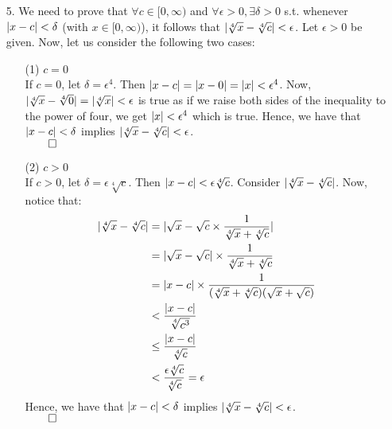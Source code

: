 \documentclass[11pt]{article}
\DeclarePairedDelimiter\abs{\lvert}{\rvert}%
\begin{document}
\begin{itemize}
    \newpage

    \item[5.]
        We need to prove that $\forall c \in [0, \infty)$ and
        $\forall \epsilon > 0, \exists \delta > 0$ s.t. whenever
        $\abs{x - c} < \delta$ (with $x \in [0, \infty)$), it follows that
        $\abs{\sqrt[4]{x} - \sqrt[4]{c}} < \epsilon$.
        Let $\epsilon > 0$ be given. Now, let us consider the following two
        cases:
        \begin{itemize}
            \item[(1)]
                $c = 0$\\
                If $c = 0$, let $\delta = \epsilon^4$. Then
                $\abs{x - c} = \abs{x - 0} = \abs{x} < \epsilon^4$.
                Now,
                $\abs{\sqrt[4]{x} - \sqrt[4]{0}} = \abs{\sqrt[4]{x}} < \epsilon$
                is true as if we raise both sides of the inequality to the
                power of four, we get $\abs{x} < \epsilon^4$ which is true.
                Hence, we have that $\abs{x - c} < \delta$ implies
                $\abs{\sqrt[4]{x} - \sqrt[4]{c}} < \epsilon$.\\
                $\qed$

            \item[(2)]
                $c > 0$\\
                If $c > 0$, let $\delta = \epsilon\sqrt[4]{c}$. Then
                $\abs{x - c} < \epsilon\sqrt[4]{c}$.
                Consider $\abs{\sqrt[4]{x} - \sqrt[4]{c}}$. Now, notice that:
                \begin{align*}
                    \abs{\sqrt[4]{x} - \sqrt[4]{c}} &= \abs{\sqrt{x} - \sqrt{c} \times \dfrac{1}{\sqrt[4]{x} + \sqrt[4]{c}}}\\
                                                    &= \abs{\sqrt{x} - \sqrt{c}} \times \dfrac{1}{\sqrt[4]{x} + \sqrt[4]{c}}\\
                                                    &= \abs{x - c} \times \dfrac{1}{(\sqrt[4]{x} + \sqrt[4]{c})(\sqrt{x} + \sqrt{c})}\\
                                                    &< \dfrac{\abs{x - c}}{\sqrt[4]{c^3}}\\
                                                    &\leq \dfrac{\abs{x - c}}{\sqrt[4]{c}}\\
                                                    &< \dfrac{\epsilon\sqrt[4]{c}}{\sqrt[4]{c}} = \epsilon
                \end{align*}
                Hence, we have that $\abs{x - c} < \delta$ implies
                $\abs{\sqrt[4]{x} - \sqrt[4]{c}} < \epsilon$.\\
                $\qed$
        \end{itemize}


\end{itemize}
\end{document}
